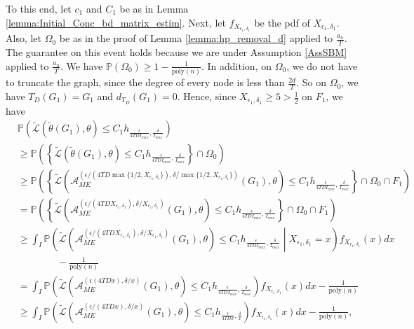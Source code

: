 \documentclass{article}
\begin{document}
To this end, let $c_1$ and $C_1$ be as in Lemma \ref{lemma:Initial_Conc_bd_matrix_estim}. Next, let $f_{X_{\epsilon_1, \delta_1}}$ be the pdf of $X_{\epsilon_1, \delta_1}$. Also, let $\Omega_0$ be as in the proof of Lemma \ref{lemma:hp_removal_d} applied to $\frac{a_n}{T}$. The guarantee on this event holds because we are under Assumption \ref{AssSBM} applied to $\frac{a_n}{T}$. We have $\mathbb{P}(\Omega_0) \geq 1 - \frac{1}{\mathrm{poly}(n)}$. In addition, on $\Omega_0$, we do not have to truncate the graph, since the degree of every node is less than $\frac{2d}{T}$. So on $\Omega_0$, we have $T_{D}(G_1) = G_1$ and $d_{T_{D}}(G_1) = 0$. Hence, since $X_{\epsilon_1, \delta_1} \geq 5 > \frac{1}{2}$ on $F_1$, we have
\begin{align*}
&\mathbb{P}\left(\widetilde{\mathcal{L}}\left(\widetilde{\theta}(G_1), \theta\right) \leq C_1h_{\frac{\epsilon}{4TDI_{max}}, \frac{\delta}{I_{max}}}\right)\\
&\geq \mathbb{P}\left(\left\{\widetilde{\mathcal{L}}\left(\widetilde{\theta}(G_1), \theta\right) \leq C_1h_{\frac{\epsilon}{4TDI_{max}}, \frac{\delta}{I_{max}}}\right\} \cap \Omega_0\right)\\
&\geq \mathbb{P}\left(\left\{\widetilde{\mathcal{L}}\left(\mathcal{A}_{ME}^{\left(\epsilon/(4TD\max\{1/2, X_{\epsilon_1, \delta_1}\}), \delta/\max\{1/2, X_{\epsilon_1, \delta_1}\}\right)}(G_1), \theta\right) \leq C_1h_{\frac{\epsilon}{4TDI_{max}}, \frac{\delta}{I_{max}}}\right\} \cap \Omega_0 \cap F_1\right)\\
&= \mathbb{P}\left(\left\{\widetilde{\mathcal{L}}\left(\mathcal{A}_{ME}^{\left(\epsilon/(4TDX_{\epsilon_1, \delta_1}), \delta/X_{\epsilon_1, \delta_1}\right)}(G_1), \theta\right) \leq C_1h_{\frac{\epsilon}{4TDI_{max}}, \frac{\delta}{I_{max}}}\right\} \cap \Omega_0 \cap F_1\right)\\
&\geq \int_I\mathbb{P}\left(\widetilde{\mathcal{L}}\left(\mathcal{A}_{ME}^{\left(\epsilon/(4TDX_{\epsilon_1, \delta_1}), \delta/X_{\epsilon_1, \delta_1}\right)}(G_1), \theta\right) \leq C_1h_{\frac{\epsilon}{4TDI_{max}}, \frac{\delta}{I_{max}}}\middle\vert X_{\epsilon_1, \delta_1} = x\right)f_{X_{\epsilon_1, \delta_1}}(x)dx \\
%
& \qquad \qquad - \frac{1}{\mathrm{poly}(n)}\\
&= \int_I\mathbb{P}\left(\widetilde{\mathcal{L}}\left(\mathcal{A}_{ME}^{\left(\epsilon(4TDx), \delta/x\right)}(G_1), \theta\right) \leq C_1h_{\frac{\epsilon}{4TDI_{max}}, \frac{\delta}{I_{max}}}\right)f_{X_{\epsilon_1, \delta_1}}(x)dx - \frac{1}{\mathrm{poly}(n)}\\
&\geq \int_I\mathbb{P}\left(\widetilde{\mathcal{L}}\left(\mathcal{A}_{ME}^{\left(\epsilon/(4TDx), \delta/x\right)}(G_1), \theta\right) \leq C_1h_{\frac{\epsilon}{4TDx}, \frac{\delta}{x}}\right)f_{X_{\epsilon_1, \delta_1}}(x)dx - \frac{1}{\mathrm{poly}(n)},
\end{align*}
\end{document}
